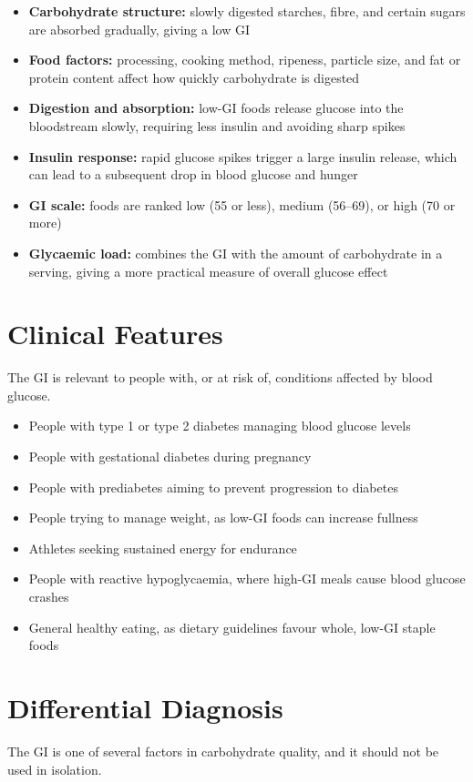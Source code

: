 \begin{itemize}
    \item \textbf{Carbohydrate structure:} slowly digested starches, fibre, and certain sugars are absorbed gradually, giving a low GI
    \item \textbf{Food factors:} processing, cooking method, ripeness, particle size, and fat or protein content affect how quickly carbohydrate is digested
    \item \textbf{Digestion and absorption:} low-GI foods release glucose into the bloodstream slowly, requiring less insulin and avoiding sharp spikes
    \item \textbf{Insulin response:} rapid glucose spikes trigger a large insulin release, which can lead to a subsequent drop in blood glucose and hunger
    \item \textbf{GI scale:} foods are ranked low (55 or less), medium (56--69), or high (70 or more)
    \item \textbf{Glycaemic load:} combines the GI with the amount of carbohydrate in a serving, giving a more practical measure of overall glucose effect
\end{itemize}

\section*{Clinical Features}
The GI is relevant to people with, or at risk of, conditions affected by blood glucose.

\begin{itemize}
    \item People with type 1 or type 2 diabetes managing blood glucose levels
    \item People with gestational diabetes during pregnancy
    \item People with prediabetes aiming to prevent progression to diabetes
    \item People trying to manage weight, as low-GI foods can increase fullness
    \item Athletes seeking sustained energy for endurance
    \item People with reactive hypoglycaemia, where high-GI meals cause blood glucose crashes
    \item General healthy eating, as dietary guidelines favour whole, low-GI staple foods
\end{itemize}

\section*{Differential Diagnosis}
The GI is one of several factors in carbohydrate quality, and it should not be used in isolation.

